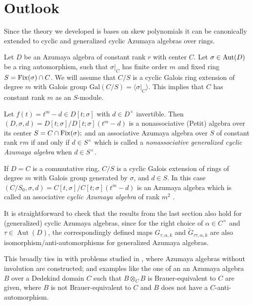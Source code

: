 \documentclass{amsart}
\theoremstyle{plain}
\theoremstyle{definition}
\numberwithin{equation}{section}
\numberwithin{figure}{section}
\DeclareMathOperator{\Aut}{Aut}
\begin{document}
\section{Outlook}\label{sec:Azumaya}



Since the theory we developed is bases on skew polynomials it can be canonically extended to cyclic and generalized cyclic Azumaya algebras over rings.

Let $D$ be an Azumaya algebra of constant rank $r$ with center $C$.
Let $\sigma\in {\rm Aut}(D)$ be a ring automorphism, such that $\sigma|_{C}$ has finite order $m$ and fixed ring $S={\rm Fix}(\sigma)\cap C$. We will assume that $C/S$ is a cyclic Galois ring extension of degree $m$ with Galois group $\mathrm{Gal}(C/S) = \langle \sigma |_{C} \rangle$. This implies that $C$ has constant rank $m$ as an $S$-module.

Let  $f(t)=t^m-d\in D[t;\sigma]$ with $d\in D^\times$ invertible.  Then $(D,\sigma,d)=D[t;\sigma]/D[t;\sigma](t^m-d)$ is a nonassociative (Petit) algebra over its center
$S=C\cap{\rm Fix}(\sigma);$
and an associative Azumaya algebra over $S$  of constant rank $rm$ if and only if $d\in S^\times$ which is called a  \emph{nonassociative generalized  cyclic Azumaya algebra} when $d\in S^\times$.


If $D=C$ is a commutative ring, $C/S$ is a cyclic Galois extension of rings of degree $m$ with Galois group generated by $\sigma$, and $ d\in S$. In this case $(C/S_0,\sigma,d)=C[t,\sigma]/C[t;\sigma](t^m-d)$ is an Azumaya algebra which is called an associative \emph{cyclic Azumaya algebra}  of rank $m^2$  \cite{Pum2021, Sz}.

It is straightforward to check that the results from the last section also hold for (generalized) cyclic Azumaya algebras, since for the right choice of $\alpha\in C^\times$ and $\tau\in \Aut(D)$, the correspondingly defined maps $G_{\tau,\alpha,k}$ and $\widetilde G_{\tau\tau,\alpha,k}$ are also isomorphism/anti-automorphisms for generalized Azumaya algebras.

This broadly ties in with problems studied in \cite{First}, where Azumaya algebras without involution are constructed; and examples like  the one of an an Azumaya algebra $B$ over a Dedekind domain $C$ such that $B\otimes_CB $ is Brauer-equivalent to $C$ are given, where $ B$ is not Brauer-equivalent to $C$ and $B$ does not have a $C$-anti-automorphism.
\end{document}
